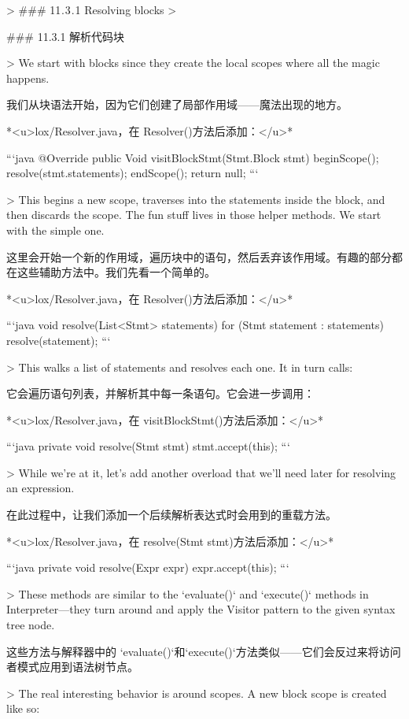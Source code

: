 \documentclass[cn,11pt,chinese]{elegantbook}
\begin{document}
{{{{{{{{{{{{> ### 11 . 3 . 1 Resolving blocks
>

### 11.3.1 解析代码块

> We start with blocks since they create the local scopes where all the magic happens.

我们从块语法开始，因为它们创建了局部作用域——魔法出现的地方。

*<u>lox/Resolver.java，在 Resolver()方法后添加：</u>*

```java
  @Override
  public Void visitBlockStmt(Stmt.Block stmt) {
    beginScope();
    resolve(stmt.statements);
    endScope();
    return null;
  }
```

> This begins a new scope, traverses into the statements inside the block, and then discards the scope. The fun stuff lives in those helper methods. We start with the simple one.

这里会开始一个新的作用域，遍历块中的语句，然后丢弃该作用域。有趣的部分都在这些辅助方法中。我们先看一个简单的。

*<u>lox/Resolver.java，在 Resolver()方法后添加：</u>*

```java
  void resolve(List<Stmt> statements) {
    for (Stmt statement : statements) {
      resolve(statement);
    }
  }
```

> This walks a list of statements and resolves each one. It in turn calls:

它会遍历语句列表，并解析其中每一条语句。它会进一步调用：

*<u>lox/Resolver.java，在 visitBlockStmt()方法后添加：</u>*

```java
  private void resolve(Stmt stmt) {
    stmt.accept(this);
  }
```

> While we’re at it, let’s add another overload that we’ll need later for resolving an expression.

在此过程中，让我们添加一个后续解析表达式时会用到的重载方法。

*<u>lox/Resolver.java，在 resolve(Stmt stmt)方法后添加：</u>*

```java
  private void resolve(Expr expr) {
    expr.accept(this);
  }
```

> These methods are similar to the `evaluate()` and `execute()` methods in Interpreter—they turn around and apply the Visitor pattern to the given syntax tree node.

这些方法与解释器中的 `evaluate()`和`execute()`方法类似——它们会反过来将访问者模式应用到语法树节点。

> The real interesting behavior is around scopes. A new block scope is created like so:

}}}}}}}}}}}}
\end{document}
